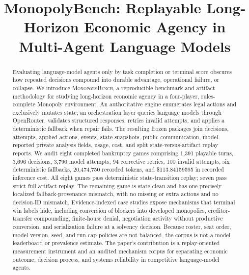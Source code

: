 \documentclass[conference]{IEEEtran}
\newcommand{\Bench}{\textsc{MonopolyBench}\xspace}
\begin{document}
\title{MonopolyBench: Replayable Long-Horizon Economic Agency in Multi-Agent Language Models}

\author{
}

\maketitle

\begin{abstract}
Evaluating language-model agents only by task completion or terminal score obscures how repeated decisions compound into durable advantage, operational failure, or collapse. We introduce \Bench, a reproducible benchmark and artifact methodology for studying long-horizon economic agency in a four-player, rules-complete Monopoly environment. An authoritative engine enumerates legal actions and exclusively mutates state; an orchestration layer queries language models through OpenRouter, validates structured responses, retries invalid attempts, and applies a deterministic fallback when repair fails. The resulting frozen packages join decisions, attempts, applied actions, events, state snapshots, public communication, model-reported private analysis fields, usage, cost, and split state-versus-artifact replay reports. We audit eight completed bankruptcy games comprising 1,391 playable turns, 3,696 decisions, 3,790 model attempts, 94 corrective retries, 100 invalid attempts, six deterministic fallbacks, 20,474,750 recorded tokens, and \$113.84159595 in recorded inference cost. All eight games pass deterministic state-transition replay; seven pass strict full-artifact replay. The remaining game is state-clean and has one precisely localized fallback-provenance mismatch, with no missing or extra actions and no decision-ID mismatch. Evidence-indexed case studies expose mechanisms that terminal win labels hide, including conversion of blockers into developed monopolies, creditor-transfer compounding, finite-house denial, negotiation activity without productive conversion, and serialization failure at a solvency decision. Because roster, seat order, model version, seed, and run-cap policies are not balanced, the corpus is not a model leaderboard or prevalence estimate. The paper's contribution is a replay-oriented measurement instrument and an audited mechanism corpus for separating economic outcome, decision process, and systems reliability in competitive language-model agents.
\end{abstract}
\end{document}
